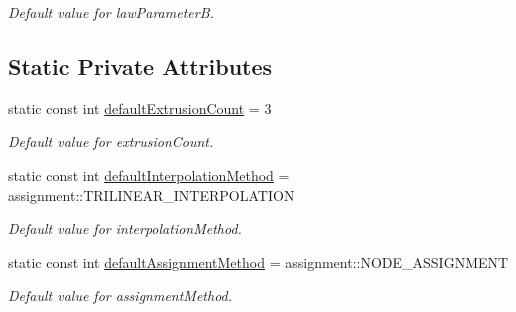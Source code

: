 \begin{DoxyCompactItemize}
\begin{DoxyCompactList}\small\item\em Default value for lawParameterB. \item\end{DoxyCompactList}\end{DoxyCompactItemize}
\subsection*{Static Private Attributes}
\begin{DoxyCompactItemize}
\item 
\hypertarget{classcommand_1_1_parameter_parser_ac15a30464e62c3505577b585ef975ed9}{
static const int \hyperlink{classcommand_1_1_parameter_parser_ac15a30464e62c3505577b585ef975ed9}{defaultExtrusionCount} = 3}
\label{classcommand_1_1_parameter_parser_ac15a30464e62c3505577b585ef975ed9}

\begin{DoxyCompactList}\small\item\em Default value for extrusionCount. \item\end{DoxyCompactList}\item 
\hypertarget{classcommand_1_1_parameter_parser_a99f702ccb0b934b9fa80f28ff5b78480}{
static const int \hyperlink{classcommand_1_1_parameter_parser_a99f702ccb0b934b9fa80f28ff5b78480}{defaultInterpolationMethod} = assignment::TRILINEAR\_\-INTERPOLATION}
\label{classcommand_1_1_parameter_parser_a99f702ccb0b934b9fa80f28ff5b78480}

\begin{DoxyCompactList}\small\item\em Default value for interpolationMethod. \item\end{DoxyCompactList}\item 
\hypertarget{classcommand_1_1_parameter_parser_a5e26fd646039c484fd61461074654e43}{
static const int \hyperlink{classcommand_1_1_parameter_parser_a5e26fd646039c484fd61461074654e43}{defaultAssignmentMethod} = assignment::NODE\_\-ASSIGNMENT}
\label{classcommand_1_1_parameter_parser_a5e26fd646039c484fd61461074654e43}

\begin{DoxyCompactList}\small\item\em Default value for assignmentMethod. \item\end{DoxyCompactList}\end{DoxyCompactItemize}


